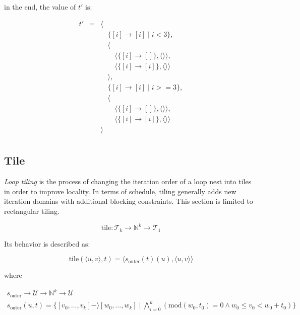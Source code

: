 \documentclass{article}
\begin{document}
\noindent in the end, the value of $t'$ is:

\[
    \begin{array}{lcl}
        t'&=& \langle \\
          & & \quad\{[i] \rightarrow [i] \mid i < 3 \},\\
          & & \quad\langle \\
          & & \quad\quad \langle\{ [i] \rightarrow [] \}, \langle\rangle\rangle,\\
          & & \quad\quad \langle\{ [i] \rightarrow [i] \}, \langle\rangle\rangle\\
          & & \quad\rangle, \\
          & & \quad\{[i] \rightarrow [i] \mid i >= 3 \},\\
          & & \quad\langle \\
          & & \quad\quad \langle\{ [i] \rightarrow [] \}, \langle\rangle\rangle,\\
          & & \quad\quad \langle\{ [i] \rightarrow [i] \}, \langle\rangle\rangle\\
          & & \rangle \\
    \end{array}
\]

\subsection{Tile}

\emph{Loop tiling} is the process of changing the iteration order of a loop
nest into tiles in order to improve locality. In terms of schedule, tiling
generally adds new iteration domains with additional blocking constraints. This
section is limited to rectangular tiling.

\[
    \mathrm{tile}: \mathcal{T}_k \rightarrow \mathbb{N}^k \rightarrow \mathcal{T}_1
\]

Its behavior is described as:

\[
    \mathrm{tile}(\langle u, v\rangle, t) = \langle  s_\mathrm{outer}(t)(u), \langle  u, v \rangle \rangle
\]

\noindent where

\[
    \begin{array}{l}
        s_\mathrm{outer} \rightarrow \mathcal{U} \rightarrow \mathbb{N}^k \rightarrow \mathcal{U} \\
    s_\mathrm{outer}(u, t) = \{ [v_0, \ldots, v_k] -\rangle [w_0, \ldots, w_k] \mid \bigwedge_{i=0}^k(\mathrm{mod}(w_0, t_0) = 0 \wedge w_0 \le v_0 < w_0 + t_0) \}
    \end{array}
\]
\end{document}
